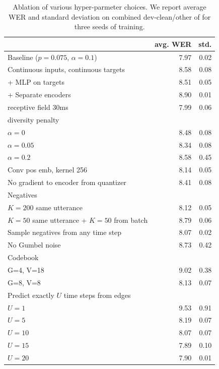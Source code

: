 \documentclass{article}
\begin{document}
\begin{table}[h!]
\caption{%
Ablation of various hyper-parmeter choices. We report average WER and standard deviation on combined dev-clean/other of \libri{} for three seeds of training.
}
\label{tbl:ablations}
\centering
\begin{tabular}{lrr}
\toprule
{} & avg. WER &  std. \\
\midrule
Baseline ($p=0.075$, $\alpha=0.1$) & 7.97 & 0.02 \\
\midrule
Continuous inputs, continuous targets & 8.58 & 0.08 \\
+ MLP on targets & 8.51 & 0.05 \\
+ Separate encoders & 8.90 & 0.01 \\
\midrule
receptive field 30ms & 7.99 & 0.06 \\
\midrule
diversity penalty \\
$\alpha=0$ & 8.48 & 0.08 \\
$\alpha=0.05$ & 8.34 & 0.08 \\
$\alpha=0.2$ & 8.58 & 0.45 \\
\midrule
\midrule
Conv pos emb, kernel 256 & 8.14 & 0.05 \\
\midrule
No gradient to encoder from quantizer & 8.41 & 0.08 \\
\midrule
Negatives \\
$K=200$ same utterance & 8.12 & 0.05 \\
$K=50$ same utterance + $K=50$ from batch & 8.79 & 0.06 \\
\midrule
Sample negatives from any time step & 8.07 & 0.02 \\
\midrule
No Gumbel noise & 8.73 & 0.42 \\
\midrule
Codebook \\
G=4, V=18 & 9.02 & 0.38 \\
G=8, V=8 & 8.13 & 0.07 \\
\midrule
Predict exactly $U$ time steps from edges \\
$U=1$ & 9.53 & 0.91 \\
$U=5$ & 8.19 & 0.07 \\
$U=10$ & 8.07 & 0.07 \\
$U=15$ & 7.89 & 0.10 \\
$U=20$ & 7.90 & 0.01 \\
\bottomrule
\end{tabular}
\end{table}
\end{document}
